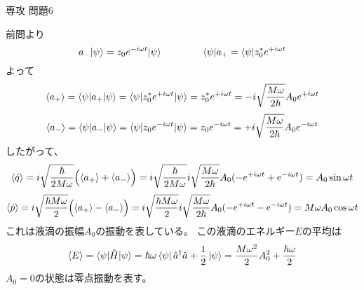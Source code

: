 \documentclass[fleqn]{jbook}
\begin{document}
\begin{answer}{専攻 問題6}{}
\begin{subanswers}
\begin{subsubanswers}
  \SubSubAnswer
    前問より
%
    \[ \ha\Ket{\psi}  = z_0 e^{-i\omega t}\Ket{\psi} \hspace{15mm}%
       \Bra{\psi}\had = \Bra{\psi} z_0^{\ast} e^{+i\omega t} \]
%
    よって
%
    \[ \Mean{\had} = \Bracket{\psi}{\had}{\psi}%
                   = \Bracket{\psi}{z_0^{\ast} e^{+i\omega t}}{\psi}%
                   = z_0^{\ast} e^{+i\omega t}%
                   = -i\sqrt{\frac{M\omega}{2\hbar}}A_0 e^{+i\omega t} \]
    \[ \Mean{\ha} = \Bracket{\psi}{\ha}{\psi}%
                   = \Bracket{\psi}{z_0 e^{-i\omega t}}{\psi}%
                   = z_0 e^{-i\omega t}%
                   = +i\sqrt{\frac{M\omega}{2\hbar}}A_0 e^{-i\omega t} \]
%
    したがって、
%
    \[ \Mean{\hq}  = i\sqrt{\frac{\hbar}{2M\omega}}\Bigl(\Mean{\had}+\Mean{\ha}\Bigr)%
                   = i\sqrt{\frac{\hbar}{2M\omega}}i\sqrt{\frac{M\omega}{2\hbar}}A_0(-e^{+i\omega t}+e^{-i\omega t})%
                   = A_0 \sin{\omega t} \]
    \[ \Mean{\hp}  = i\sqrt{\frac{\hbar M\omega}{2}}\Bigl(\Mean{\had}-\Mean{\ha}\Bigr)%
                   = i\sqrt{\frac{\hbar M\omega}{2}}i\sqrt{\frac{M\omega}{2\hbar}}A_0(-e^{+i\omega t}-e^{-i\omega t})%
                   = M\omega A_0 \cos{\omega t} \]
%
    これは液滴の振幅$A_0$の振動を表している。
    この液滴のエネルギー$E$の平均は
%
    \[ \Mean{E} = \Bracket{\psi}{\hat{H}}{\psi}%
                = \hbar\omega \left<\psi\right|\hat{a}^\dagger\hat{a}+\frac{1}{2}\left|\psi\right> = \frac{M\omega^2}{2}A_0^2 + \frac{\hbar\omega}{2} \]
%
    $A_0=0$の状態は零点振動を表す。
  \end{subsubanswers}
\end{subanswers}
\end{answer}
\end{document}
